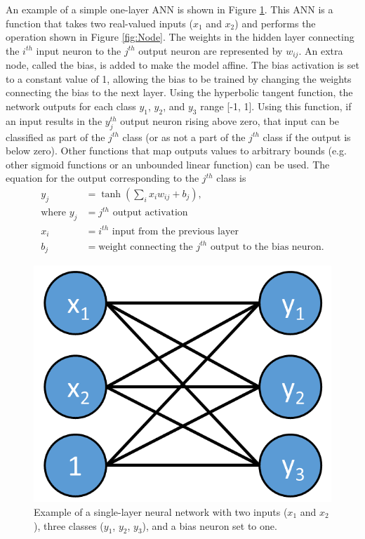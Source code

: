 An example of a simple one-layer ANN is shown in Figure \ref{fig:one_layer_net}. This ANN is a function that takes two real-valued inputs ($x_1$ and $x_2$) and performs the operation shown in Figure \ref{fig:Node}. The weights in the hidden layer connecting the $i^{th}$ input neuron to the $j^{th}$ output neuron are represented by $w_{ij}$. An extra node, called the bias, is added to make the model affine. The bias activation is set to a constant value of 1, allowing the bias to be trained by changing the weights connecting the bias to the next layer. Using the hyperbolic tangent function, the network outputs for each class $y_1$, $y_2$, and $y_3$ range [-1, 1]. Using this function, if an input results in the $y_{j}^{th}$ output neuron rising above zero, that input can be classified as part of the ${j}^{th}$ class (or as not a part of the ${j}^{th}$ class if the output is below zero). Other functions that map outputs values to arbitrary bounds (e.g. other sigmoid functions or an unbounded linear function) can be used. The equation for the output corresponding to the $j^{th}$ class is 
%
\begin{align} \label{eq:single_layer_eq_sum}
y_j &= \tanh(\sum_i x_i w_{ij} + b_j), \\
\text{where } y_j &= j^{th} \text{ output activation} \nonumber \\
x_i &= i^{th} \text{ input from the previous layer} \nonumber \\
b_j &= \text{weight connecting the } j^{th} \text{ output to the bias neuron.} \nonumber
\end{align}
%
\begin{figure}[H]
	\centering
	\includegraphics[width=0.45\linewidth]{images/One_layer_net_v31}
	\caption{Example of a single-layer neural network with two inputs ($x_{1}$ and $x_{2}$), three classes ($y_{1}$, $y_{2}$, $y_{3}$), and a bias neuron set to one.}
	\label{fig:one_layer_net}
\end{figure}
%

